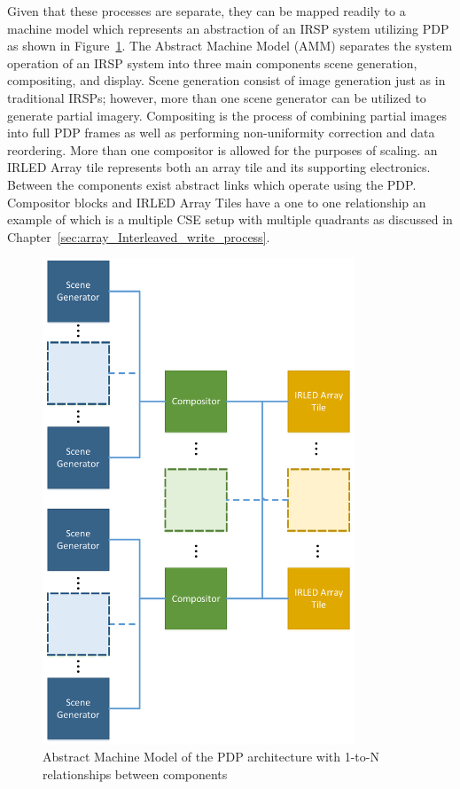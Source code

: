     Given that these processes are separate, they can be mapped readily to a machine model which represents an abstraction of an IRSP system utilizing PDP as shown in Figure~\ref{fig:amm}. The Abstract Machine Model (AMM) separates the system operation of an IRSP system into three main components scene generation, compositing, and display. Scene generation consist of image generation just as in traditional IRSPs; however, more than one scene generator can be utilized to generate partial imagery. Compositing is the process of combining partial images into full PDP frames as well as performing non-uniformity correction and data reordering. More than one compositor is allowed for the purposes of scaling. an IRLED Array tile represents both an array tile and its supporting electronics. Between the components exist abstract links which operate using the PDP. Compositor blocks and IRLED Array Tiles have a one to one relationship an example of which is a multiple CSE setup with multiple quadrants as discussed in Chapter~\ref{sec:array_Interleaved_write_process}.

    \begin{figure}
        \centering
        \includegraphics[width=0.83\textwidth]{fig/amm.pdf}
        \caption{Abstract Machine Model of the PDP architecture with 1-to-N relationships between components}
        \label{fig:amm}
    \end{figure}

